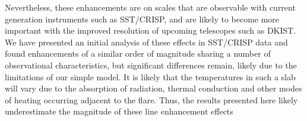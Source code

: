 Nevertheless, these enhancements are on scales that are observable with current generation instruments such as SST/CRISP, and are likely to become more important with the improved resolution of upcoming telescopes such as DKIST.
We have presented an initial analysis of these effects in SST/CRISP data and found enhancements of a similar order of magnitude sharing a number of observational characteristics, but significant differences remain, likely due to the limitations of our simple model.
It is likely that the temperatures in such a slab will vary due to the absorption of radiation, thermal conduction and other modes of heating occurring adjacent to the flare.
Thus, the results presented here likely underestimate the magnitude of these line enhancement effects 